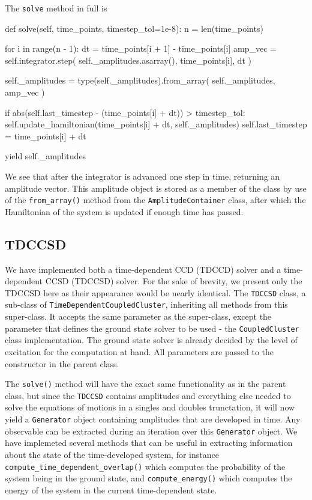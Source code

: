     

    The \lstinline{solve} method in full is
    \begin{python}
    def solve(self, time_points, timestep_tol=1e-8):
        n = len(time_points)

        for i in range(n - 1):
            dt = time_points[i + 1] - time_points[i]
            amp_vec = self.integrator.step(
                self._amplitudes.asarray(), time_points[i], dt
            )

            self._amplitudes = type(self._amplitudes).from_array(
                self._amplitudes, amp_vec
            )

            if abs(self.last_timestep - (time_points[i] + dt)) > timestep_tol:
                self.update_hamiltonian(time_points[i] + dt, self._amplitudes)
                self.last_timestep = time_points[i] + dt

            yield self._amplitudes
    \end{python}
    We see that after the integrator is advanced one step in time, returning an amplitude 
    vector. This amplitude object is stored as a member of the class by use of the 
    \lstinline{from_array()} method from the \lstinline{AmplitudeContainer} class,
    after which the  
    Hamiltonian of the system is updated if enough time has passed.

    \subsection{TDCCSD}

    We have implemented both a time-dependent CCD (TDCCD) solver and a time-dependent CCSD
    (TDCCSD)
    solver. For the sake of brevity, we present only the TDCCSD here as their appearance 
    would be nearly identical. 
    The \lstinline{TDCCSD} class, a sub-class of \lstinline{TimeDependentCoupledCluster},
    inheriting all methods from this super-class. It accepts the same parameter as the super-class, except the 
    parameter that defines the ground state solver to be used - the \lstinline{CoupledCluster}
    class implementation. The ground state solver is already decided by the level of 
    excitation for the computation at hand. All parameters are passed to the constructor 
    in the parent class.

    The \lstinline{solve()} method will have the exact same functionality as in the parent class,
    but since the \lstinline{TDCCSD} contains amplitudes and everything else needed to 
    solve the equations of motions in a singles and doubles trunctation, it will now yield a 
    \lstinline{Generator} object 
    containing amplitudes that are developed in time. Any observable can be extracted during 
    an iteration over this \lstinline{Generator} object. We have implemeted several methods that 
    can be useful in extracting information about the state of the time-developed system,
    for instance \lstinline{compute_time_dependent_overlap()} which computes the 
    probability of the system being in the ground state, and \lstinline{compute_energy()} 
    which computes the energy of the system in the current time-dependent state.

